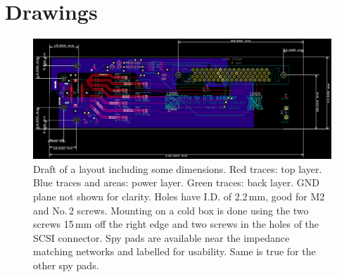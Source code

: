 \chapter{Drawings}


\begin{figure}[hbtp]
	\begin{center}
	\includegraphics[width=1.0\textwidth]{img/FPix2DTBadapterDrawing.png}
	\end{center}
	\caption{Draft of a layout including some dimensions. Red traces: top layer. Blue traces and areas: power layer. Green traces: back layer. GND plane not shown for clarity. Holes have I.D. of 2.2\,mm, good for M2 and No.\,2 screws. Mounting on a cold box is done using the two screws 15\,mm off the right edge and two screws in the holes of the SCSI connector. Spy pads are available near the impedance matching networks and labelled for usability. Same is true for the other spy pads.}
	\label{fig:FPix2DTBadapterDrawing}
\end{figure}

